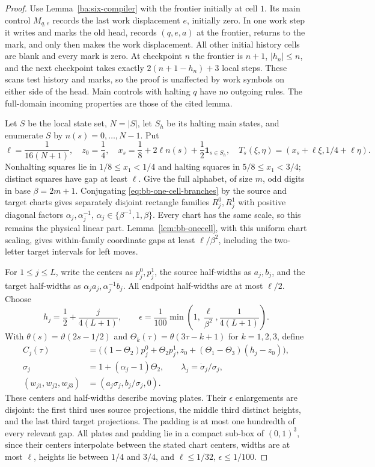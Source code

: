 \begin{proof}\label{ba:torus-plates-proof}
Use Lemma~\ref{ba:six-compiler} with the frontier initially at cell $1$.
Its main control $M_{q,e}$ records the last work displacement $e$, initially
zero.  In one work step it writes and marks the old head, records
$(q,e,a)$ at the frontier, returns to the mark, and only then makes the
work displacement.  All other initial history cells are blank and every
mark is zero.  At checkpoint $n$ the frontier is $n+1$, $|h_n|\le n$,
and the next checkpoint takes exactly $2(n+1-h_n)+3$ local steps.
These scans test history and marks, so the proof is unaffected by work
symbols on either side of the head.  Main controls with halting $q$ have
no outgoing rules.  The full-domain incoming properties are those of
the cited lemma.

Let $S$ be the local state set, $N=|S|$, let $S_h$ be its halting main
states, and enumerate $S$ by $n(s)=0,\ldots,N-1$.  Put
\[
 \ell=\frac1{16(N+1)},\quad z_0=\frac14,\quad
 x_s=\frac18+2\ell n(s)+\frac12\mathbf1_{s\in S_h},\quad
 T_s(\xi,\eta)=(x_s+\ell\xi,1/4+\ell\eta).
\]
Nonhalting squares lie in $1/8\le x_1<1/4$ and halting squares in
$5/8\le x_1<3/4$; distinct squares have gap at least $\ell$.
Give the full alphabet, of size $m$, odd digits in base $\beta=2m+1$.
Conjugating \eqref{eq:bb-one-cell-branches} by the source and target charts
gives separately disjoint rectangle families $R_j^0,R_j^1$ with positive
diagonal factors $\alpha_j,\alpha_j^{-1}$,
$\alpha_j\in\{\beta^{-1},1,\beta\}$.  Every chart has the same
scale, so this remains the physical linear part.
Lemma~\ref{lem:bb-onecell}, with this uniform chart scaling, gives
within-family coordinate gaps at least $\ell/\beta^2$, including the
two-letter target intervals for left moves.

For $1\le j\le L$, write the centers as $p_j^0,p_j^1$, the source
half-widths as $a_j,b_j$, and the target half-widths as
$\alpha_ja_j,\alpha_j^{-1}b_j$.  All endpoint half-widths are at
most $\ell/2$.  Choose
\[
 h_j=\frac12+\frac{j}{4(L+1)},\qquad
 \epsilon=\frac1{100}\min\left(1,\frac\ell{\beta^2},
                                      \frac1{4(L+1)}\right).
\]
With $\theta(s)=\vartheta(2s-1/2)$ and
$\Theta_k(\tau)=\theta(3\tau-k+1)$ for $k=1,2,3$, define
\[
 \begin{aligned}
 C_j(\tau)&=\big((1-\Theta_2)p_j^0+\Theta_2p_j^1,
                      z_0+(\Theta_1-\Theta_3)(h_j-z_0)\big),\\
 \sigma_j&=1+(\alpha_j-1)\Theta_2,\qquad
 \lambda_j=\dot\sigma_j/\sigma_j,\\
 (w_{j1},w_{j2},w_{j3})&=(a_j\sigma_j,b_j/\sigma_j,0).
 \end{aligned}
\]
These centers and half-widths describe moving plates.  Their
$\epsilon$ enlargements are disjoint: the first third uses source
projections, the middle third distinct heights, and the last third
target projections.  The padding is at most one hundredth of every
relevant gap.  All plates and padding lie in a compact sub-box of
$(0,1)^3$, since their centers interpolate between the stated chart
centers, widths are at most $\ell$, heights lie between $1/4$ and
$3/4$, and $\ell\le1/32$, $\epsilon\le1/100$.


\end{proof}
